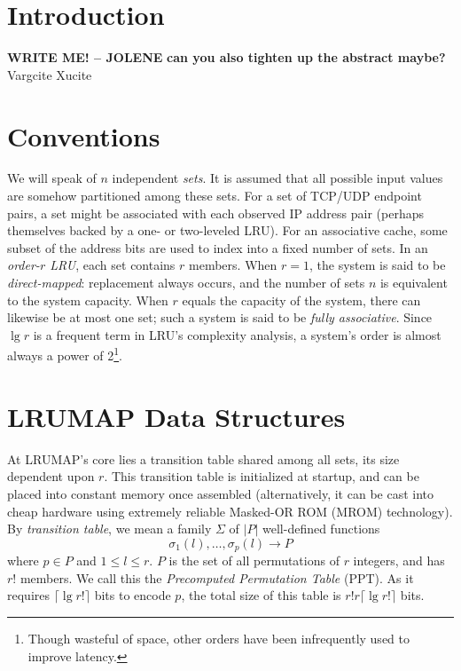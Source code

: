 \documentclass[10pt]{sigplanconf}
\begin{document}
\section{Introduction}
\textbf{WRITE ME! -- JOLENE}
\textbf{can you also tighten up the abstract maybe?}
Vargcite\citep{varghese}
Xucite\citep{xu}

\section{Conventions}
We will speak of $n$ independent \textit{sets}. It is assumed that all possible
input values are somehow partitioned among these sets. For a set of TCP/UDP
endpoint pairs, a set might be associated with each observed IP address pair
(perhaps themselves backed by a one- or two-leveled LRU). For an associative
cache, some subset of the address bits are used to index into a fixed number of
sets. In an \textit{order-$r$ LRU}, each set contains $r$ members. When $r=1$,
the system is said to be \textit{direct-mapped}: replacement always occurs, and
the number of sets $n$ is equivalent to the system capacity. When $r$ equals
the capacity of the system, there can likewise be at most one set; such a system
is said to be \textit{fully associative}. Since $\lg{r}$ is a frequent term in
LRU's complexity analysis, a system's order is almost always a power of 2\footnote{Though
wasteful of space, other orders have been infrequently used to improve latency\citep{intelcpuid}.}.
\section{LRUMAP Data Structures}
At LRUMAP's core lies a transition table shared among all sets, its size
dependent upon $r$. This transition table is initialized at startup, and can be
placed into constant memory once assembled (alternatively, it can be cast into
cheap hardware using extremely reliable Masked-OR ROM (MROM)
technology\citep{ice}). By \textit{transition table}, we mean a family $\Sigma$ of $|P|$
well-defined functions \begin{equation*}
\sigma_{1}(l),\dotsc,\sigma_{p}(l)\longrightarrow{P}
\end{equation*} where $p\in{P}$ and $1\le{l}\le{r}$. $P$ is the set of all
permutations of $r$ integers, and has $r!$ members. We call this the \textit{Precomputed
Permutation Table} (PPT). As it requires $\lceil\lg{r!}\rceil$
bits to encode $p$, the total size of this table is $r!r\lceil\lg{r!}\rceil$ bits.
\end{document}
